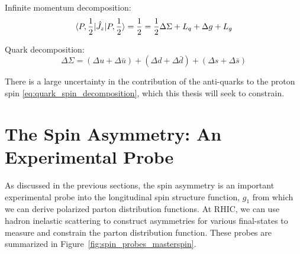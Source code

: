 {\noindent}Infinite momentum decomposition:
\begin{equation}
  \braket{P,{1\over2}|\hat{J_z}|P,{1\over2}}  
  = {1\over2} = {{1\over2}\Delta \Sigma +L_q+\Delta g + L_g}
  \label{eq:infmom_ellis_jeffe_sum}
\end{equation}

{\noindent}Quark decomposition:
\begin{equation}
  {\Delta \Sigma} =
  {
    (\Delta u+\Delta \bar{u})
    +(\Delta d + \Delta \bar{d})
    +(\Delta s + \Delta \bar{s})
  }
  \label{eq:quark_spin_decomposition}
\end{equation}

There is a large uncertainty in the contribution of the anti-quarks to the
proton spin \ref{eq:quark_spin_decomposition}, which this thesis will seek to
constrain.

\section{The Spin Asymmetry: An Experimental Probe }

As discussed in the previous sections, the spin asymmetry is an important
experimental probe into the longitudinal spin structure function, $g_1$ from
which we can derive polarized parton distribution functions. At RHIC, we can use
hadron inelastic scattering to construct asymmetries for various final-states to
measure and constrain the parton distribution function. These probes are
summarized in Figure~\ref{fig:spin_probes_masterspin}.

